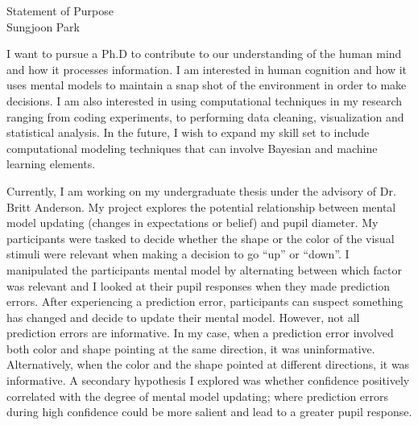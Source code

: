 \setlength{\oddsidemargin}{0in}
\setlength{\evensidemargin}{0in}
\setlength{\textwidth}{6.5in}
\setlength{\topmargin}{-.3in}
\setlength{\textheight}{9in}
\pagestyle{empty}



\begin{center}
{\Large Statement of Purpose} \\[.1in]
{\large Sungjoon Park}
\end{center}

\vspace*{.2in}

I want to pursue a Ph.D to contribute to our understanding of the human mind and how it processes information. I am interested in human cognition and how it uses mental models to maintain a snap shot of the environment in order to make decisions. I am also interested in using computational techniques in my research ranging from coding experiments, to performing data cleaning, visualization and statistical analysis. In the future, I wish to expand my skill set to include computational modeling techniques that can involve Bayesian and machine learning elements.

Currently, I am working on my undergraduate thesis under the advisory of Dr. Britt Anderson. My project explores the potential relationship between mental model updating (changes in expectations or belief) and pupil diameter. My participants were tasked to decide whether the shape or the color of the visual stimuli were relevant when making a decision to go “up” or “down”. I manipulated the participants mental model by alternating between which factor was relevant and I looked at their pupil responses when they made prediction errors. After experiencing a prediction error, participants can suspect something has changed and decide to update their mental model. However, not all prediction errors are informative. In my case, when a prediction error involved both color and shape pointing at the same direction, it was uninformative. Alternatively, when the color and the shape pointed at different directions, it was informative. A secondary hypothesis I explored was whether confidence positively correlated with the degree of mental model updating; where prediction errors during high confidence could be more salient and lead to a greater pupil response.

